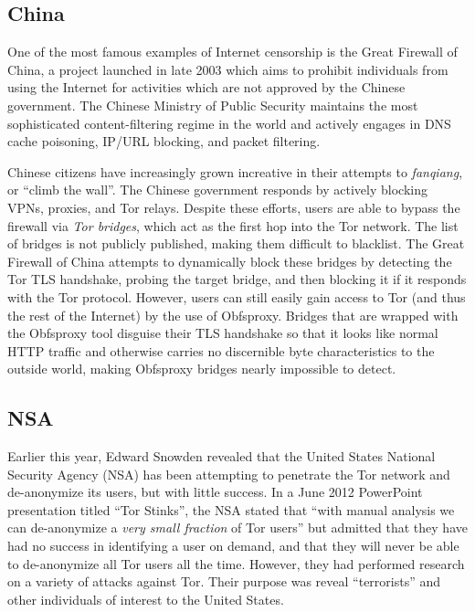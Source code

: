 \documentclass[journal]{IEEEtran}
\begin{document}
\subsection{China}

One of the most famous examples of Internet censorship is the Great Firewall of China, a project launched in late 2003 which aims to prohibit individuals from using the Internet for activities which are not approved by the Chinese government. The Chinese Ministry of Public Security maintains the most sophisticated content-filtering regime in the world and actively engages in DNS cache poisoning, IP/URL blocking, and packet filtering.

Chinese citizens have increasingly grown increative in their attempts to \textit{fanqiang}, or ``climb the wall''. The Chinese government responds by actively blocking VPNs, proxies, and Tor relays. Despite these efforts, users are able to bypass the firewall via \textit{Tor bridges}, which act as the first hop into the Tor network. The list of bridges is not publicly published, making them difficult to blacklist. The Great Firewall of China attempts to dynamically block these bridges by detecting the Tor TLS handshake, probing the target bridge, and then blocking it if it responds with the Tor protocol. However, users can still easily gain access to Tor (and thus the rest of the Internet) by the use of Obfsproxy. Bridges that are wrapped with the Obfsproxy tool disguise their TLS handshake so that it looks like normal HTTP traffic and otherwise carries no discernible byte characteristics to the outside world, making Obfsproxy bridges nearly impossible to detect.\cite{Anderson2013}

\subsection{NSA}

Earlier this year, Edward Snowden revealed that the United States National Security Agency (NSA) has been attempting to penetrate the Tor network and de-anonymize its users, but with little success. In a June 2012 PowerPoint presentation titled ``Tor Stinks'', the NSA stated that ``with manual analysis we can de-anonymize a \textit{very small fraction} of Tor users'' but admitted that they have had no success in identifying a user on demand, and that they will never be able to de-anonymize all Tor users all the time. However, they had performed research on a variety of attacks against Tor. Their purpose was reveal ``terrorists'' and other individuals of interest to the United States.
\end{document}

